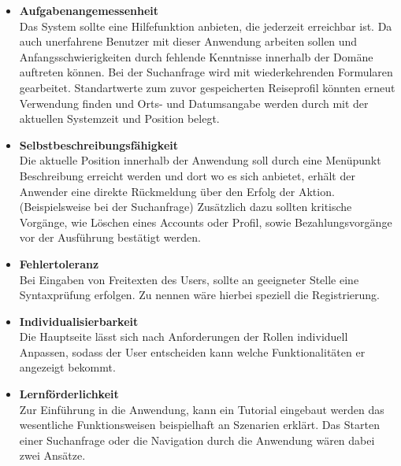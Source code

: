 \begin{itemize}
\item
\textbf{Aufgabenangemessenheit}\\
 	Das System sollte eine Hilfefunktion anbieten, die jederzeit erreichbar ist. Da auch unerfahrene Benutzer mit dieser Anwendung arbeiten sollen und Anfangsschwierigkeiten durch fehlende Kenntnisse innerhalb der Domäne auftreten können. Bei der Suchanfrage wird mit wiederkehrenden Formularen gearbeitet. Standartwerte zum zuvor gespeicherten Reiseprofil könnten erneut Verwendung finden und Orts- und Datumsangabe werden durch mit der aktuellen Systemzeit und Position belegt.
 	 
\item
\textbf{Selbstbeschreibungsfähigkeit}\\
	Die aktuelle Position innerhalb der Anwendung soll durch eine Menüpunkt Beschreibung erreicht werden und dort wo es sich anbietet, erhält der Anwender eine direkte Rückmeldung über den Erfolg der Aktion. (Beispielsweise bei der Suchanfrage) Zusätzlich dazu sollten kritische Vorgänge, wie Löschen eines Accounts oder Profil, sowie Bezahlungsvorgänge vor der Ausführung bestätigt werden.

\item
\textbf{Fehlertoleranz}\\
 	Bei Eingaben von Freitexten des Users, sollte an geeigneter Stelle eine Syntaxprüfung erfolgen. Zu nennen wäre hierbei speziell die Registrierung. 

 \item
\textbf{Individualisierbarkeit}\\
 	Die Hauptseite lässt sich nach Anforderungen der Rollen individuell Anpassen, sodass der User entscheiden kann welche Funktionalitäten er angezeigt bekommt.

 \item
\textbf{Lernförderlichkeit}\\
	Zur Einführung in die Anwendung, kann ein Tutorial eingebaut werden das wesentliche Funktionsweisen beispielhaft an Szenarien erklärt. Das Starten einer Suchanfrage oder die Navigation durch die Anwendung wären dabei zwei Ansätze.
 \end{itemize}



